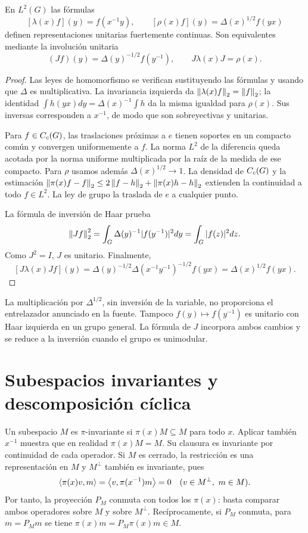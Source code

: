 \begin{proposicion}\label{v4:rep-regulares}
En $L^2(G)$ las fórmulas
\[
[\lambda(x)f](y)=f(x^{-1}y),\qquad
[\rho(x)f](y)=\Delta(x)^{1/2}f(yx)
\]
definen representaciones unitarias fuertemente continuas. Son equivalentes mediante la involución unitaria
\[
(Jf)(y)=\Delta(y)^{-1/2}f(y^{-1}),\qquad J\lambda(x)J=\rho(x).
\]
\end{proposicion}
\begin{proof}
Las leyes de homomorfismo se verifican sustituyendo las fórmulas y usando que $\Delta$ es multiplicativa. La invariancia izquierda da $\left\lVert\lambda(x)f\right\rVert_2=\left\lVert f\right\rVert_2$; la identidad $\int h(yx)dy=\Delta(x)^{-1}\int h$ da la misma igualdad para $\rho(x)$. Sus inversas corresponden a $x^{-1}$, de modo que son sobreyectivas y unitarias.

Para $f\in C_c(G)$, las traslaciones próximas a $e$ tienen soportes en un compacto común y convergen uniformemente a $f$. La norma $L^2$ de la diferencia queda acotada por la norma uniforme multiplicada por la raíz de la medida de ese compacto. Para $\rho$ usamos además $\Delta(x)^{1/2}\to1$. La densidad de $C_c(G)$ y la estimación $\left\lVert\pi(x)f-f\right\rVert_2\leq2\left\lVert f-h\right\rVert_2+\left\lVert\pi(x)h-h\right\rVert_2$ extienden la continuidad a todo $f\in L^2$. La ley de grupo la traslada de $e$ a cualquier punto.

La fórmula de inversión de Haar prueba
\[
\left\lVert Jf\right\rVert_2^2=\int_G\Delta(y)^{-1}|f(y^{-1})|^2dy
=\int_G|f(z)|^2dz.
\]
Como $J^2=I$, $J$ es unitario. Finalmente,
\[
[J\lambda(x)Jf](y)
=\Delta(y)^{-1/2}\Delta(x^{-1}y^{-1})^{-1/2}f(yx)
=\Delta(x)^{1/2}f(yx).
\]
\end{proof}
\begin{observacion}
La multiplicación por $\Delta^{1/2}$, sin inversión de la variable, no proporciona el entrelazador anunciado en la fuente. Tampoco $f(y)\mapsto f(y^{-1})$ es unitario con Haar izquierda en un grupo general. La fórmula de $J$ incorpora ambos cambios y se reduce a la inversión cuando el grupo es unimodular.
\end{observacion}

\section{Subespacios invariantes y descomposición cíclica}
Un subespacio $M$ es $\pi$-invariante si $\pi(x)M\subseteq M$ para todo $x$. Aplicar también $x^{-1}$ muestra que en realidad $\pi(x)M=M$. Su clausura es invariante por continuidad de cada operador. Si $M$ es cerrado, la restricción es una representación en $M$ y $M^\perp$ también es invariante, pues
\[
\left\langle\pi(x)v,m\right\rangle=\left\langle v,\pi(x^{-1})m\right\rangle=0\quad(v\in M^\perp,\ m\in M).
\]
Por tanto, la proyección $P_M$ conmuta con todos los $\pi(x)$: basta comparar ambos operadores sobre $M$ y sobre $M^\perp$. Recíprocamente, si $P_M$ conmuta, para $m=P_Mm$ se tiene $\pi(x)m=P_M\pi(x)m\in M$.

